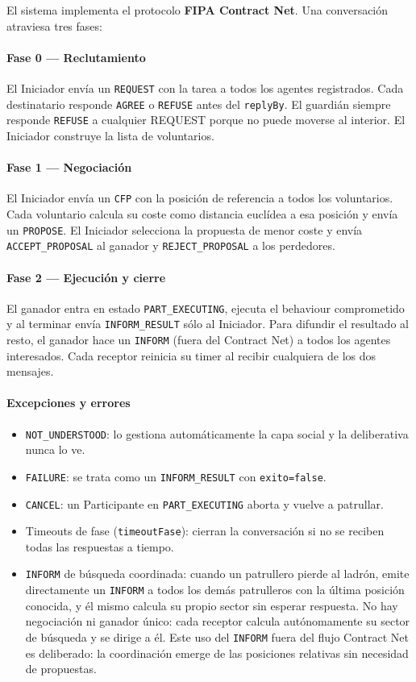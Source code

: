 \documentclass[a4paper,12pt]{article}
\begin{document}
El sistema implementa el protocolo \textbf{FIPA Contract Net}. Una conversación atraviesa tres fases:

\paragraph{Fase 0 — Reclutamiento} El Iniciador envía un \texttt{REQUEST} con la tarea a todos los agentes registrados. Cada destinatario responde \texttt{AGREE} o \texttt{REFUSE} antes del \texttt{replyBy}. El guardián siempre responde \texttt{REFUSE} a cualquier REQUEST porque no puede moverse al interior. El Iniciador construye la lista de voluntarios.

\paragraph{Fase 1 — Negociación} El Iniciador envía un \texttt{CFP} con la posición de referencia a todos los voluntarios. Cada voluntario calcula su coste como distancia euclídea a esa posición y envía un \texttt{PROPOSE}. El Iniciador selecciona la propuesta de menor coste y envía \texttt{ACCEPT\_PROPOSAL} al ganador y \texttt{REJECT\_PROPOSAL} a los perdedores.

\paragraph{Fase 2 — Ejecución y cierre} El ganador entra en estado \texttt{PART\_EXECUTING}, ejecuta el behaviour comprometido y al terminar envía \texttt{INFORM\_RESULT} sólo al Iniciador. Para difundir el resultado al resto, el ganador hace un \texttt{INFORM} (fuera del Contract Net) a todos los agentes interesados. Cada receptor reinicia su timer al recibir cualquiera de los dos mensajes.

\paragraph{Excepciones y errores}

\begin{itemize}
    \item \texttt{NOT\_UNDERSTOOD}: lo gestiona automáticamente la capa social y la deliberativa nunca lo ve.
    \item \texttt{FAILURE}: se trata como un \texttt{INFORM\_RESULT} con \texttt{exito=false}.
    \item \texttt{CANCEL}: un Participante en \texttt{PART\_EXECUTING} aborta y vuelve a patrullar.
    \item Timeouts de fase (\texttt{timeoutFase}): cierran la conversación si no se reciben todas las respuestas a tiempo.
    \item \texttt{INFORM} de búsqueda coordinada: cuando un patrullero pierde al ladrón, emite directamente un \texttt{INFORM} a todos los demás patrulleros con la última posición conocida, y él mismo calcula su propio sector sin esperar respuesta. No hay negociación ni ganador único: cada receptor calcula autónomamente su sector de búsqueda y se dirige a él. Este uso del \texttt{INFORM} fuera del flujo Contract Net es deliberado: la coordinación emerge de las posiciones relativas sin necesidad de propuestas.
\end{itemize}
\end{document}
